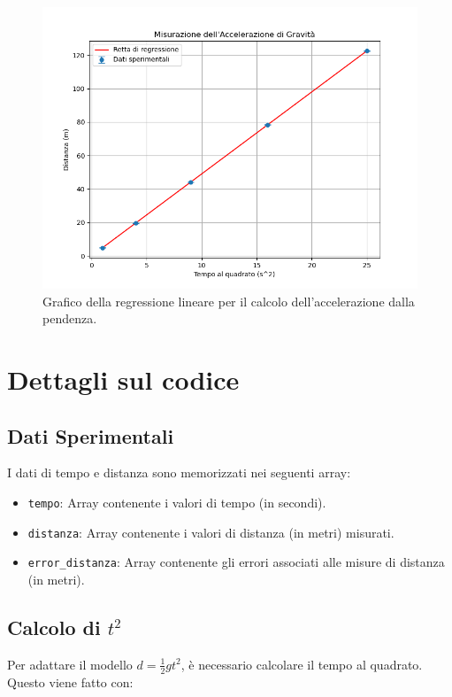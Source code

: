 \documentclass[a4paper,12pt]{article}
\begin{document}
\begin{figure}[h]
    \centering
\includegraphics[scale=0.6]{g.png} 
    \caption{Grafico della regressione lineare per il calcolo dell'accelerazione dalla pendenza.}
    \label{fig:g}
\end{figure}

\section{Dettagli sul codice}

\subsection{Dati Sperimentali}
I dati di tempo e distanza sono memorizzati nei seguenti array:

\begin{itemize}
    \item \texttt{tempo}: Array contenente i valori di tempo (in secondi).
    \item \texttt{distanza}: Array contenente i valori di distanza (in metri) misurati.
    \item \texttt{error\_distanza}: Array contenente gli errori associati alle misure di distanza (in metri).
\end{itemize}

\subsection{Calcolo di \( t^2 \)}
Per adattare il modello \( d = \frac{1}{2} g t^2 \), è necessario calcolare il tempo al quadrato. Questo viene fatto con:
\end{document}
